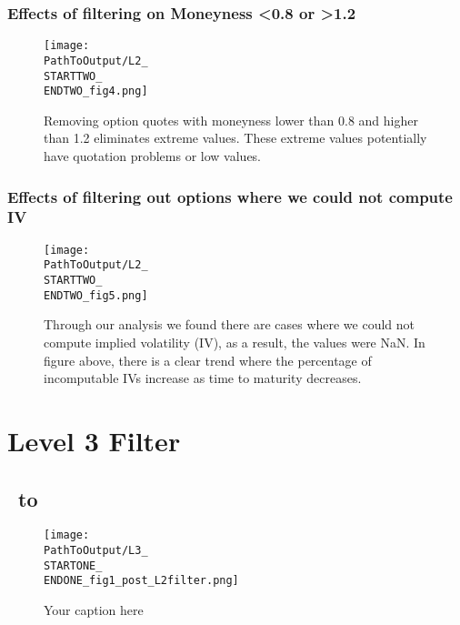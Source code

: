 \begin{appendix}
\subsubsection{Effects of filtering on Moneyness <0.8 or >1.2}
\begin{figure}[H] %
  \centering
{}
  \texttt{[image: \\PathToOutput/L2\_\\STARTTWO\_\\ENDTWO\_fig4.png]}%
\captionsetup{font=normalfont}
  \caption{Removing option quotes with moneyness lower than 0.8 and higher than 1.2 eliminates extreme values. These extreme values potentially have quotation problems or low values.}
  \label{fig:time2lvl2fig4}
\end{figure}


\subsubsection{Effects of filtering out options where we could not compute IV}
\begin{figure}[H] %
  \centering
{}
  \texttt{[image: \\PathToOutput/L2\_\\STARTTWO\_\\ENDTWO\_fig5.png]}%
\captionsetup{font=normalfont}
  \caption{Through our analysis we found there are cases where we could not compute implied volatility (IV), as a result, the values were NaN. In figure above, there is a clear trend where the percentage of incomputable IVs increase as time to maturity decreases.}
 \label{fig:time2lvl2fig5}
\end{figure}




\newpage
\section{Level 3 Filter}\label{app:lvl3}
\subsection{\STARTONE\ to \ENDONE }

\begin{figure}[H] %
  \centering
  \texttt{[image: \\PathToOutput/L3\_\\STARTONE\_\\ENDONE\_fig1\_post\_L2filter.png]}%
  \caption{Your caption here}
 \label{fig:time1lvl3fig1}
\end{figure}



\end{appendix}
